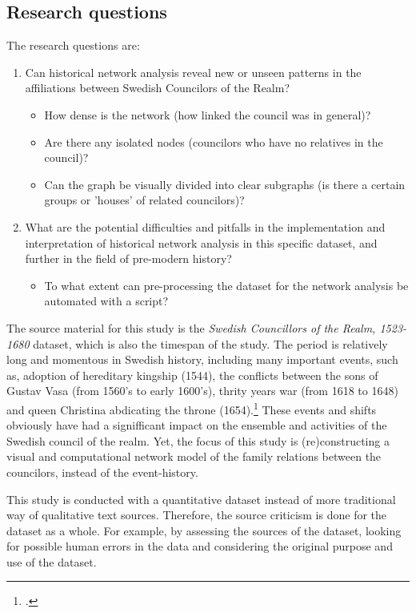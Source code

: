 \documentclass[a4paper,12pt]{article}
\begin{document}
\begin{onehalfspace}
\subsection{Research questions}
The research questions are:
\begin{enumerate}
	\item Can historical network analysis reveal new or unseen patterns in the affiliations between Swedish Councilors of the Realm? \begin{itemize}
		\item How dense is the network (how linked the council was in general)?
		\item Are there any isolated nodes (councilors who have no relatives in the council)?
		\item Can the graph be visually divided into clear subgraphs (is there a certain groups or 'houses' of related councilors)?
	\end{itemize}	
	\item What are the potential difficulties and pitfalls in the implementation and interpretation of historical network analysis in this specific dataset, and further in the field of pre-modern history? \begin{itemize}	
		\item To what extent can pre-processing the dataset for the network analysis be automated with a script?
	\end{itemize}
\end{enumerate} 

The source material for this study is the \textit{Swedish Councillors of the Realm, 1523-1680} dataset, which is also the timespan of the study. The period is relatively long and momentous in Swedish history, including many important events, such as, adoption of hereditary kingship (1544), the conflicts between the sons of Gustav Vasa (from 1560's to early 1600's), thrity years war (from 1618 to 1648) and queen Christina abdicating the throne (1654).\footcite[p. 8-9.]{personalAgency} These events and shifts obviously have had a signifficant impact on the ensemble and activities of the Swedish council of the realm. Yet, the focus of this study is (re)constructing a visual and computational network model of the family relations between the councilors, instead of the event-history. 

This study is conducted with a quantitative dataset instead of more traditional way of qualitative text sources. Therefore, the source criticism is done for the dataset as a whole. For example, by assessing the sources of the dataset, looking for possible human errors in the data and considering the original purpose and use of the dataset. 


\end{onehalfspace}
\end{document}
